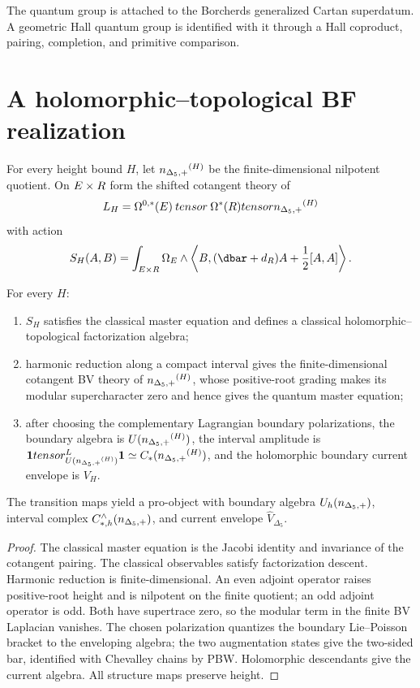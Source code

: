 \begin{remark}
The quantum group is attached to the Borcherds generalized Cartan superdatum.  A geometric Hall quantum group is identified with it through a Hall coproduct, pairing, completion, and primitive comparison.
\end{remark}

\chapter{A holomorphic--topological BF realization}
For every height bound $H$, let ${n_{\Delta_5,+}}^{(H)}$ be the finite-dimensional nilpotent quotient.  On $E\times R$ form the shifted cotangent theory of
\[
 L_H=\Omega^{0,*}(E)\mathbin{tensor}\Omega^*(R)tensor{n_{\Delta_5,+}}^{(H)}
\]
with action
\[
 S_H(A,B)=\int_{E\times\R}\Omega_E\wedge
 \left\langle B,(\dbar+\dd_{\R})A+\frac12[A,A]\right\rangle .
\]

\begin{theorem}
For every $H$:
\begin{enumerate}
\item $S_H$ satisfies the classical master equation and defines a classical holomorphic--topological factorization algebra;
\item harmonic reduction along a compact interval gives the finite-dimensional cotangent BV theory of ${n_{\Delta_5,+}}^{(H)}$, whose positive-root grading makes its modular supercharacter zero and hence gives the quantum master equation;
\item after choosing the complementary Lagrangian boundary polarizations, the boundary algebra is $U({n_{\Delta_5,+}}^{(H)})$, the interval amplitude is $\mathbf{1}tensor^{L}_{U({n_{\Delta_5,+}}^{(H)})}\mathbf{1}\simeq C_*({n_{\Delta_5,+}}^{(H)})$, and the holomorphic boundary current envelope is $V_H$.
\end{enumerate}
The transition maps yield a pro-object with boundary algebra $U_h({n_{\Delta_5,+}})$, interval complex $C_{*,h}^{\wedge}({n_{\Delta_5,+}})$, and current envelope $\widehat V_{\Delta_5}$.
\end{theorem}
\begin{proof}
The classical master equation is the Jacobi identity and invariance of the cotangent pairing.  The classical observables satisfy factorization descent.  Harmonic reduction is finite-dimensional.  An even adjoint operator raises positive-root height and is nilpotent on the finite quotient; an odd adjoint operator is odd.  Both have supertrace zero, so the modular term in the finite BV Laplacian vanishes.  The chosen polarization quantizes the boundary Lie--Poisson bracket to the enveloping algebra; the two augmentation states give the two-sided bar, identified with Chevalley chains by PBW.  Holomorphic descendants give the current algebra.  All structure maps preserve height.
\end{proof}


